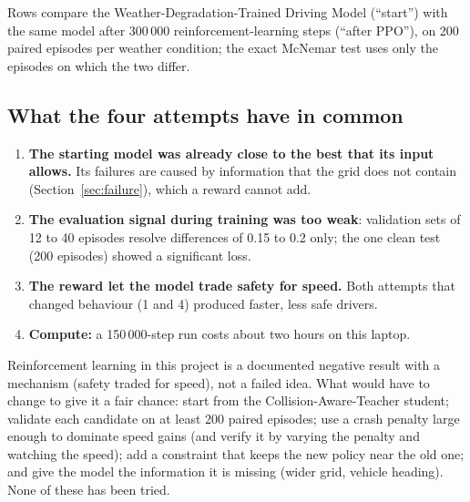 \begin{cautionbox}
Rows compare the Weather-Degradation-Trained Driving Model (``start'') with the same model after 300\,000 reinforcement-learning steps (``after PPO''), on 200 paired episodes per weather condition; the exact McNemar test uses only the episodes on which the two differ.
\end{cautionbox}

\subsection{What the four attempts have in common}
\begin{enumerate}
\item \textbf{The starting model was already close to the best that its input allows.} Its failures are caused by information that the grid does not contain (Section~\ref{sec:failure}), which a reward cannot add.
\item \textbf{The evaluation signal during training was too weak}: validation sets of 12 to 40 episodes resolve differences of 0.15 to 0.2 only; the one clean test (200 episodes) showed a significant loss.
\item \textbf{The reward let the model trade safety for speed.} Both attempts that changed behaviour (1 and 4) produced faster, less safe drivers.
\item \textbf{Compute:} a 150\,000-step run costs about two hours on this laptop.
\end{enumerate}

\begin{implicationbox}
Reinforcement learning in this project is a documented negative result with a mechanism (safety traded for speed), not a failed idea. What would have to change to give it a fair chance: start from the Collision-Aware-Teacher student; validate each candidate on at least 200 paired episodes; use a crash penalty large enough to dominate speed gains (and verify it by varying the penalty and watching the speed); add a constraint that keeps the new policy near the old one; and give the model the information it is missing (wider grid, vehicle heading). None of these has been tried.
\end{implicationbox}
